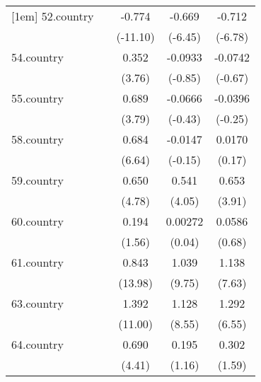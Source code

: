{\begin{tabular}{l*{4}{c}}
[1em]
52.country  &                     &      -0.774\sym{***}&      -0.669\sym{***}&      -0.712\sym{***}\\
            &                     &    (-11.10)         &     (-6.45)         &     (-6.78)         \\
[1em]
54.country  &                     &       0.352\sym{***}&     -0.0933         &     -0.0742         \\
            &                     &      (3.76)         &     (-0.85)         &     (-0.67)         \\
[1em]
55.country  &                     &       0.689\sym{***}&     -0.0666         &     -0.0396         \\
            &                     &      (3.79)         &     (-0.43)         &     (-0.25)         \\
[1em]
58.country  &                     &       0.684\sym{***}&     -0.0147         &      0.0170         \\
            &                     &      (6.64)         &     (-0.15)         &      (0.17)         \\
[1em]
59.country  &                     &       0.650\sym{***}&       0.541\sym{***}&       0.653\sym{***}\\
            &                     &      (4.78)         &      (4.05)         &      (3.91)         \\
[1em]
60.country  &                     &       0.194         &     0.00272         &      0.0586         \\
            &                     &      (1.56)         &      (0.04)         &      (0.68)         \\
[1em]
61.country  &                     &       0.843\sym{***}&       1.039\sym{***}&       1.138\sym{***}\\
            &                     &     (13.98)         &      (9.75)         &      (7.63)         \\
[1em]
63.country  &                     &       1.392\sym{***}&       1.128\sym{***}&       1.292\sym{***}\\
            &                     &     (11.00)         &      (8.55)         &      (6.55)         \\
[1em]
64.country  &                     &       0.690\sym{***}&       0.195         &       0.302         \\
            &                     &      (4.41)         &      (1.16)         &      (1.59)         \\

\end{tabular}}

